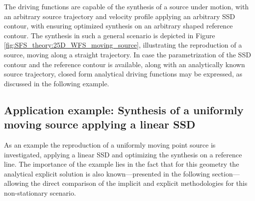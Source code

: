 The driving functions are capable of the synthesis of a source under motion, with an arbitrary source trajectory and velocity profile applying an arbitrary SSD contour, with ensuring optimized synthesis on an arbitrary shaped reference contour.
The synthesis in such a general scenario is depicted in Figure \ref{fig:SFS_theory:25D_WFS_moving_source}, illustrating the reproduction of a source, moving along a straight trajectory.
In case the parametrization of the SSD contour and the reference contour is available, along with an analytically known source trajectory, closed form analytical driving functions may be expressed, as discussed in the following example.

\subsection*{Application example: Synthesis of a uniformly moving source applying a linear SSD}

As an example the reproduction of a uniformly moving point source is investigated, applying a linear SSD and optimizing the synthesis on a reference line.
The importance of the example lies in the fact that for this geometry the analytical explicit solution is also known---presented in the following section---allowing the direct comparison of the implicit and explicit methodologies for this non-stationary scenario.

